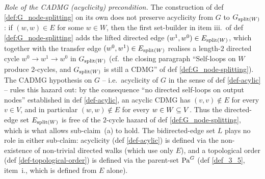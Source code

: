 \documentclass[main]{subfiles}
\begin{document}
\begin{Rem}[SplitTopologicalOrder]
    \emph{Role of the CADMG (acyclicity) precondition.}
    The construction of def \ref{def:G_node-splitting} on its own does not preserve acyclicity from $G$ to $G_{\mathrm{split}(W)}$: if $(w, w) \in E$ for some $w \in W$, then the first set-builder in item iii.\ of def \ref{def:G_node-splitting} adds the lifted directed edge $(w^1, w^0) \in E_{\mathrm{split}(W)}$, which together with the transfer edge $(w^0, w^1) \in E_{\mathrm{split}(W)}$ realises a length-$2$ directed cycle $w^0 \to w^1 \to w^0$ in $G_{\mathrm{split}(W)}$ (cf.\ the closing paragraph ``Self-loops on $W$ produce $2$-cycles, and $G_{\mathrm{split}(W)}$ is still a CDMG'' of def \ref{def:G_node-splitting}). The CADMG hypothesis on $G$ -- i.e.\ acyclicity of $G$ in the sense of def \ref{def-acylic} -- rules this hazard out: by the consequence ``no directed self-loops on output nodes'' established in def \ref{def-acylic}, an acyclic CDMG has $(v, v) \notin E$ for every $v \in V$, and in particular $(w, w) \notin E$ for every $w \in W \subseteq V$. Thus the directed-edge set $E_{\mathrm{split}(W)}$ is free of the $2$-cycle hazard of def \ref{def:G_node-splitting}, which is what allows sub-claim~(a) to hold. The bidirected-edge set $L$ plays no role in either sub-claim: acyclicity (def \ref{def-acylic}) is defined via the non-existence of non-trivial directed walks (which use only $E$), and a topological order (def \ref{def-topological-order}) is defined via the parent-set $\mathrm{Pa}^G$ (def \ref{def_3_5}, item~i., which is defined from $E$ alone).
\end{Rem}
\end{document}
